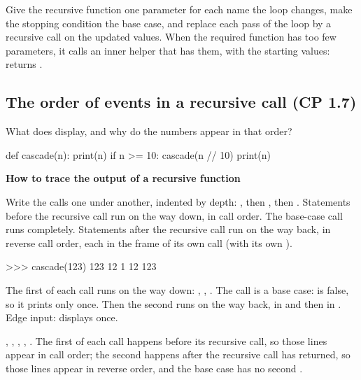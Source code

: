 \documentclass[10pt]{scrartcl}
\newenvironment{howto}[1]{\begin{mdframed}[style=howtostyle]{\color{NavyBlue}\textbf{#1}}\par\vspace{2pt}}{\end{mdframed}}
\begin{document}
\revisit Give the recursive function one parameter for each name the loop changes, make the stopping condition the base case, and replace each pass of the loop by a recursive call on the updated values. When the required function has too few parameters, it calls an inner helper that has them, with the starting values:  returns .

\subsection{The order of events in a recursive call (CP 1.7)}
\begin{qbox}
  What does  display, and why do the numbers appear in that order?
\end{qbox}
\begin{py}
def cascade(n):
    print(n)
    if n >= 10:
        cascade(n // 10)
        print(n)
\end{py}
\begin{howto}{How to trace the output of a recursive function}
\begin{steps}
  \ii Write the calls one under another, indented by depth: , then , then .
  \ii Statements before the recursive call run on the way down, in call order.
  \ii The base-case call runs completely.
  \ii Statements after the recursive call run on the way back, in reverse call order, each in the frame of its own call (with its own ).
\end{steps}
\end{howto}
\begin{example*}
\begin{py}
>>> cascade(123)
123
12
1
12
123
\end{py}
The first  of each call runs on the way down: , , . The call  is a base case:  is false, so it prints only once. Then the second  runs on the way back, in  and then in . Edge input:  displays  once.
\end{example*}
\revisit {}, , , , . The first  of each call happens before its recursive call, so those lines appear in call order; the second  happens after the recursive call has returned, so those lines appear in reverse order, and the base case  has no second .
\end{document}
